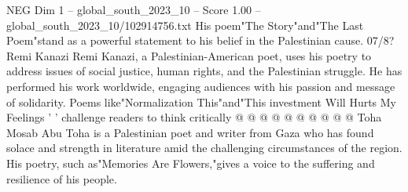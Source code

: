 \begin{textsample}{NEG Dim 1 – global\_south\_2023\_10 – Score 1.00 – global\_south\_2023\_10/102914756.txt}
His poem"The Story"and"The Last Poem"stand as a powerful statement to his belief in the Palestinian cause. 07/8?
Remi Kanazi Remi Kanazi, a Palestinian-American poet, uses his poetry to address issues of social justice, human rights, and the Palestinian struggle.
He has performed his work worldwide, engaging audiences with his passion and message of solidarity.
Poems like"Normalization This"and"This investment Will Hurts My Feelings ' ' challenge readers to think critically @ @ @ @ @ @ @ @ @ @ Toha Mosab Abu Toha is a Palestinian poet and writer from Gaza who has found solace and strength in literature amid the challenging circumstances of the region.
His poetry, such as"Memories Are Flowers,"gives a voice to the suffering and resilience of his people.

\end{textsample}
